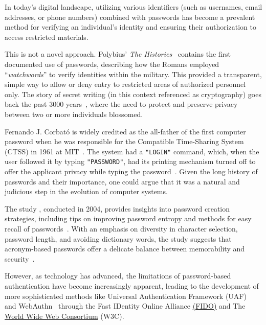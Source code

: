 In today's digital landscape, utilizing various identifiers (such as usernames, email addresses, or phone numbers)
combined with passwords has become a prevalent method for verifying an individual's identity and ensuring
their authorization to access restricted materials.

This is not a novel approach.
Polybius' \textit{The Histories}~\cite{perseus_tufts} contains the first documented use
of passwords, describing
how
the Romans employed ``\textit{watchwords}'' to verify identities within the military.
This provided a transparent, simple way to allow or deny entry to restricted areas of authorized personnel only.
The story of secret writing (in this context referenced as cryptography) goes
back the past 3000 years~\cite{history_cryptography_cryptanalysis}, where the
need to protect and preserve privacy between two or more individuals blossomed.

Fernando J. Corbató is widely credited as the all-father of the first
computer password when he was responsible for the Compatible Time-Sharing
System (CTSS) in 1961 at MIT~\cite{levy1984hackers}.
The system had a \texttt{"LOGIN"} command, which, when the user followed it by
typing \texttt{"PASSWORD"}, had its printing mechanism turned off to offer
the applicant privacy while typing the password~\cite{ctss_programmers_guide}.
Given the long history of passwords and their importance, one could argue that
it was a natural and judicious step in the evolution of computer systems.

The study , conducted in
2004, provides insights into password creation strategies, including tips on
improving password entropy and methods for easy recall of passwords~\cite{
    yan2000password}.
With an emphasis on diversity in character selection, password length, and
avoiding dictionary words, the study suggests that acronym-based passwords offer
a delicate balance between memorability and security~\cite{yan2000password}.

However, as technology has advanced, the limitations of password-based
authentication have become increasingly apparent, leading to the development of
more sophisticated methods like Universal Authentication Framework
(UAF)~\cite{fido_uaf_overview} and WebAuthn~\cite{webauthn_level_2} through the
Fast IDentity Online Alliance \href{https://fidoalliance.org}{(FIDO)} and
The \href{https://www.w3.org}{World Wide Web Consortium} (W3C).

\newcommand{\assymetricCrypto}{\footnote{Asymmetric cryptography uses a
key-pair consisting of public and private keys. The public key encrypts data,
while the private key decrypts it. The keys are mathematically related, but
    deriving one from the other is infeasible, ensuring secure communication and
    data exchange.}}
\newcommand{\jsonwebLibrary}{\footnote{
    \textbf{Note:} According to the library used to implement
    \href{https://docs.rs/jsonwebtoken/latest/jsonwebtoken/index.html}{jsonwebtokens in Rust}
    it is the private key that encrypts and the public key is responsible for \href{https://docs.rs/jsonwebtoken/latest/jsonwebtoken/struct.DecodingKey.html#method.from_rsa_pem}
    {decrypting}. \textit{Last Accessed: 2023-03-25}.}}

